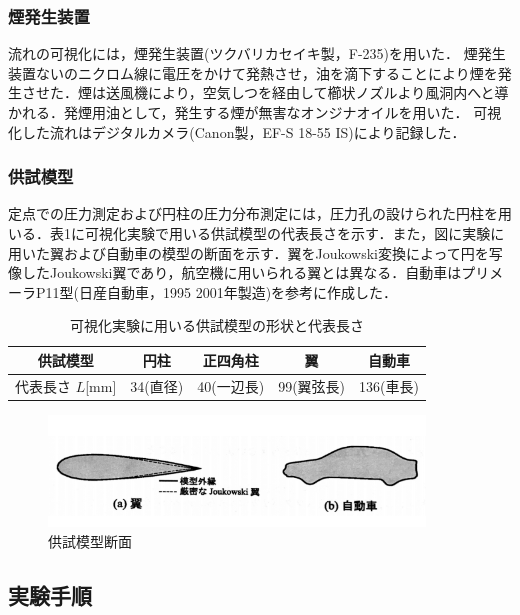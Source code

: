 \documentclass[a4paper,11pt,uplatex]{jsarticle}
\begin{document}
\subsubsection{煙発生装置}
流れの可視化には，煙発生装置(ツクバリカセイキ製，F-235)を用いた．
煙発生装置ないのニクロム線に電圧をかけて発熱させ，油を滴下することにより煙を発生させた．煙は送風機により，空気しつを経由して櫛状ノズルより風洞内へと導かれる．発煙用油として，発生する煙が無害なオンジナオイルを用いた．
可視化した流れはデジタルカメラ(Canon製，EF-S 18-55 IS)により記録した．
\subsubsection{供試模型}
定点での圧力測定および円柱の圧力分布測定には，圧力孔の設けられた円柱を用いる．表1に可視化実験で用いる供試模型の代表長さを示す．また，図に実験に用いた翼および自動車の模型の断面を示す．翼をJoukowski変換によって円を写像したJoukowski翼であり，航空機に用いられる翼とは異なる．自動車はプリメーラP11型(日産自動車，1995 2001年製造)を参考に作成した．
\begin{table}[H]
  \centering
  \caption{可視化実験に用いる供試模型の形状と代表長さ}
  \label{供試模型}
  \begin{tabular}{ccccc} \hline
  供試模型 & 円柱　& 正四角柱 & 翼 & 自動車  \\ \hline
   代表長さ $L$[mm]&34(直径)& 40(一辺長)& 99(翼弦長)& 136(車長) \\ \hline
  \end{tabular}
\end{table}

\begin{figure}[H]
  \centering
  \includegraphics[width =10cm]{pic/断面.png}
  \caption{供試模型断面}
  \label{断面}
\end{figure}

\subsection{実験手順}
\end{document}
